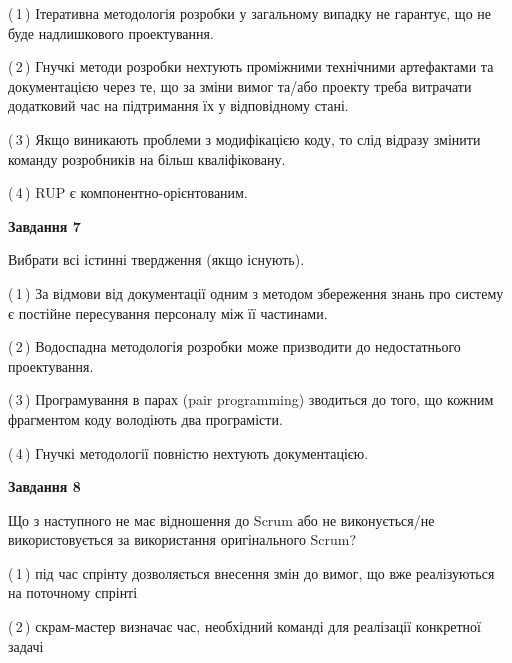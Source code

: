 \documentclass[10pt, ukrainian]{article}
\begin{document}
{\begin {large}
(\,1\,) Ітеративна методологія розробки у загальному випадку не гарантує, що не буде надлишкового проектування. %



(\,2\,) Гнучкі методи розробки нехтують проміжними технічними артефактами та документацією через те, що за зміни вимог та/або проекту треба витрачати додатковий час на підтримання їх у відповідному стані. %



(\,3\,) Якщо виникають проблеми з модифікацією коду, то слід відразу змінити команду розробників на більш кваліфіковану.%



(\,4\,) RUP є компонентно-орієнтованим. %


{\begin {center}\textbf{Завдання 7}\end {center}}\par
Вибрати всі істинні твердження (якщо існують).\par
\vspace{2mm}



(\,1\,) За відмови від документації одним з методом збереження знань про систему є постійне пересування персоналу між її частинами. %



(\,2\,) Водоспадна методологія розробки може призводити до недостатнього проектування. %



(\,3\,) Програмування в парах (pair programming) зводиться до того, що кожним фрагментом коду володіють два програмісти. %



(\,4\,) Гнучкі методології повністю нехтують документацією. %


{\begin {center}\textbf{Завдання 8}\end {center}}\par
Що з наступного не має відношення до Scrum або не виконується/не використовується за використання оригінального Scrum?\par
\vspace{2mm}



(\,1\,) під час спрінту дозволяється внесення змін до вимог, що вже реалізуються на поточному спрінті%



(\,2\,) скрам-мастер визначає час, необхідний команді для реалізації конкретної задачі%




\end{large}}
\end{document}
